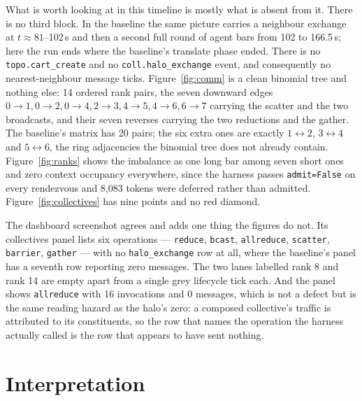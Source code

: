 \documentclass[11pt]{article}
\begin{document}
What is worth looking at in this timeline is mostly what is absent from it. There is no third block.
In the baseline the same picture carries a neighbour exchange at $t\approx81$--102\,s and then a
second full round of agent bars from 102 to 166.5\,s; here the run ends where the baseline's
translate phase ended. There is no \texttt{topo.cart\_create} and no \texttt{coll.halo\_exchange}
event, and consequently no nearest-neighbour message ticks. Figure~\ref{fig:comm} is a clean
binomial tree and nothing else: 14 ordered rank pairs, the seven downward edges
$0\!\to\!1,0\!\to\!2,0\!\to\!4,2\!\to\!3,4\!\to\!5,4\!\to\!6,6\!\to\!7$ carrying the scatter and the
two broadcasts, and their seven reverses carrying the two reductions and the gather. The baseline's
matrix has 20 pairs; the six extra ones are exactly $1\!\leftrightarrow\!2$, $3\!\leftrightarrow\!4$
and $5\!\leftrightarrow\!6$, the ring adjacencies the binomial tree does not already contain.
Figure~\ref{fig:ranks} shows the imbalance as one long bar among seven short ones and zero context
occupancy everywhere, since the harness passes \texttt{admit=False} on every rendezvous and 8,083
tokens were deferred rather than admitted. Figure~\ref{fig:collectives} has nine points and no red
diamond.

The dashboard screenshot agrees and adds one thing the figures do not. Its collectives panel lists
six operations --- \texttt{reduce}, \texttt{bcast}, \texttt{allreduce}, \texttt{scatter},
\texttt{barrier}, \texttt{gather} --- with no \texttt{halo\_exchange} row at all, where the baseline's
panel has a seventh row reporting zero messages. The two lanes labelled rank 8 and rank 14 are empty
apart from a single grey lifecycle tick each. And the panel shows \texttt{allreduce} with 16
invocations and 0 messages, which is not a defect but is the same reading hazard as the halo's zero:
a composed collective's traffic is attributed to its constituents, so the row that names the
operation the harness actually called is the row that appears to have sent nothing.

\section{Interpretation}
\end{document}
